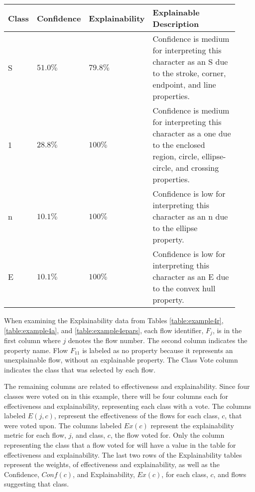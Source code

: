 \begin{table}[H]
    \renewcommand{\arraystretch}{1.3}
     \label{table:exexample4a}
    \begin{tabular}{| m{0.06\linewidth} | m{0.14\linewidth} | m{0.17\linewidth} | m{0.55\linewidth} |}
        \hline
        Class & Confidence & Explainability & Explainable Description \\
        \hline \hline
        S & $51.0\%$ & $79.8\%$ & Confidence is medium for interpreting this character as an S due to the stroke, corner, endpoint, and line properties. \\ 
        \hline
        1 & $28.8\%$ & $100\%$ & Confidence is medium for interpreting this character as a one due to the enclosed region, circle, ellipse-circle, and crossing properties. \\
        \hline
        n & $10.1\%$ & $100\%$ & Confidence is low for interpreting this character as an n due to the ellipse property. \\
        \hline
        E & $10.1\%$ & $100\%$ & Confidence is low for interpreting this character as an E due to the convex hull property. \\
       \hline
    \end{tabular}
\end{table}

When examining the Explainability data from Tables \ref{table:example4r},
\ref{table:example4a}, and \ref{table:example4epars}, each flow identifier,
$F_j$, is in the first column where $j$ denotes the flow number.  The second
column indicates the property name. Flow $F_{11}$ is labeled as no property
because it represents an unexplainable flow, without an explainable property.
The Class Vote column indicates the class that was selected by each flow.

The remaining columns are related to effectiveness and explainability.  Since
four classes were voted on in this example, there will be four columns each for
effectiveness and explainability, representing each class with a vote. The
columns labeled $E(j,c)$, represent the effectiveness of the flows for each
class, $c$, that were voted upon. The columns labeled $Ex(c)$ represent the
explainability metric for each flow, $j$, and class, $c$, the flow voted for.
Only the column representing the class that a flow voted for will have a value
in the table for effectiveness and explainability.  The last two rows of the
Explainability tables represent the weights, of effectiveness and
explainability, as well as the Confidence, $Conf(c)$, and Explainability,
$Ex(c)$, for each class, $c$, and flows suggesting that class.

